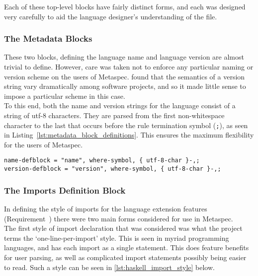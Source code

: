 Each of these top-level blocks have fairly distinct forms, and each was designed very carefully to aid the language designer's understanding of the file.

\subsubsection{The Metadata Blocks} %
\label{ssub:the_metadata_blocks}
These two blocks, defining the language name and language version are almost trivial to define. 
However, care was taken not to enforce any particular naming or version scheme on the users of Metaspec.
\citet{raemaekers2014semantic} found that the semantics of a version string vary dramatically among software projects, and so it made little sense to impose a particular scheme in this case. \\

To this end, both the name and version strings for the language consist of a string of utf-8 characters.
They are parsed from the first non-whitespace character to the last that occurs before the rule termination symbol (\lstinline{;}), as seen in Listing~\ref{lst:metadata_block_definitions}.
This ensures the maximum flexibility for the users of Metaspec. 

\begin{lstlisting}[numbers=none, caption={Metadata Block Definitions}, label={lst:metadata_block_definitions}]
name-defblock = "name", where-symbol, { utf-8-char }-,;
version-defblock = "version", where-symbol, { utf-8-char }-,;
\end{lstlisting}


\subsubsection{The Imports Definition Block} %
\label{ssub:the_imports_definition_block}
In defining the style of imports for the language extension features (Requirement~) there were two main forms considered for use in Metaspec.\\

The first style of import declaration that was considered was what the project terms the `one-line-per-import' style. 
This is seen in myriad programming languages, and has each import as a single statement. 
This does feature benefits for user parsing, as well as complicated import statements possibly being easier to read. 
Such a style can be seen in \autoref{lst:haskell_import_style} below.

